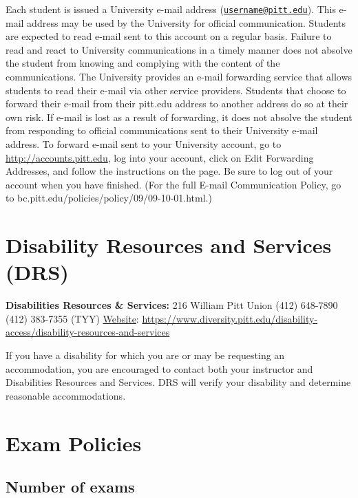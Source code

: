\documentclass[
]{book}
\begin{document}
Each student is issued a University e-mail address (\href{mailto:username@pitt.edu}{\nolinkurl{username@pitt.edu}}). This e-mail address may be used by the University for official communication. Students are expected to read e-mail sent to this account on a regular basis. Failure to read and react to University communications in a timely manner does not absolve the student from knowing and complying with the content of the communications. The University provides an e-mail forwarding service that allows students to read their e-mail via other service providers. Students that choose to forward their e-mail from their pitt.edu address to another address do so at their own risk. If e-mail is lost as a result of forwarding, it does not absolve the student from responding to official communications sent to their University e-mail address. To forward e-mail sent to your University account, go to \url{http://accounts.pitt.edu}, log into your account, click on Edit Forwarding Addresses, and follow the instructions on the page. Be sure to log out of your account when you have finished. (For the full E-mail Communication Policy, go to bc.pitt.edu/policies/policy/09/09-10-01.html.)

\hypertarget{disability-resources-and-services-drs}{%
\chapter{Disability Resources and Services (DRS)}\label{disability-resources-and-services-drs}}

\textbf{Disabilities Resources \& Services:}
216 William Pitt Union
(412) 648-7890
(412) 383-7355 (TYY)
\href{https://www.diversity.pitt.edu/disability-access/disability-resources-and-services}{Website}: \url{https://www.diversity.pitt.edu/disability-access/disability-resources-and-services}

If you have a disability for which you are or may be requesting an accommodation, you are encouraged to contact both your instructor and Disabilities Resources and Services. DRS will verify your disability and determine reasonable accommodations.

\hypertarget{exam-policies}{%
\chapter{Exam Policies}\label{exam-policies}}

\hypertarget{number-of-exams}{%
\section{Number of exams}\label{number-of-exams}}
\end{document}
